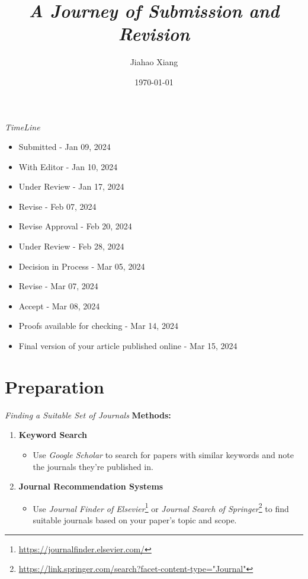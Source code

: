 \documentclass{beamer}
\title{\textit{A Journey of Submission and Revision}}
\author[xjh]{Jiahao Xiang\inst{1}}
\institute{
    \inst{1}
    Hengyang Normal University
}
\date{\today}
\begin{document}
\begin{frame}
    \titlepage
\end{frame}

\begin{frame}{\textit{TimeLine}}
    \begin{itemize}
        \item Submitted - Jan 09, 2024
        \item With Editor - Jan 10, 2024
        \item Under Review - Jan 17, 2024
        \item Revise - Feb 07, 2024
        \item Revise Approval - Feb 20, 2024
        \item Under Review - Feb 28, 2024
        \item Decision in Process - Mar 05, 2024
        \item Revise - Mar 07, 2024
        \item Accept - Mar 08, 2024
        \item Proofs available for checking - Mar 14, 2024
        \item Final version of your article published online - Mar 15, 2024
    \end{itemize}
\end{frame}



\section{Preparation}

\begin{frame}{\textit{Finding a Suitable Set of Journals}}
    \textbf{Methods:}
    \begin{enumerate}
        \item \textbf{Keyword Search}
              \begin{itemize}
                  \item Use \textit{Google Scholar} to search for papers with similar keywords and note the journals they're published in.
              \end{itemize}
        \item \textbf{Journal Recommendation Systems}
              \begin{itemize}
                  \item Use \textit{Journal Finder of Elsevier}\footnote{\url{https://journalfinder.elsevier.com/}} or \textit{Journal Search of Springer}\footnote{\url{https://link.springer.com/search?facet-content-type="Journal"}} to find suitable journals based on your paper's topic and scope.
              \end{itemize}
    \end{enumerate}
\end{frame}
\end{document}
